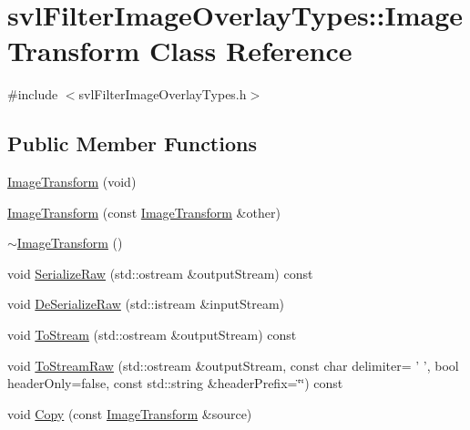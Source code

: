 \hypertarget{classsvl_filter_image_overlay_types_1_1_image_transform}{\section{svl\-Filter\-Image\-Overlay\-Types\-:\-:Image\-Transform Class Reference}
\label{classsvl_filter_image_overlay_types_1_1_image_transform}
}


{\ttfamily \#include $<$svl\-Filter\-Image\-Overlay\-Types.\-h$>$}

\subsection*{Public Member Functions}
\begin{DoxyCompactItemize}
\item 
\hyperlink{classsvl_filter_image_overlay_types_1_1_image_transform_a0aeb462b8748ba0a98dae381a91ee0e1}{Image\-Transform} (void)
\item 
\hyperlink{classsvl_filter_image_overlay_types_1_1_image_transform_a4486f53440c4c5bc2d2681ec78f59fab}{Image\-Transform} (const \hyperlink{classsvl_filter_image_overlay_types_1_1_image_transform}{Image\-Transform} \&other)
\item 
\hyperlink{classsvl_filter_image_overlay_types_1_1_image_transform_a42d898db223c9d5b55711a1bd6194c53}{$\sim$\-Image\-Transform} ()
\item 
void \hyperlink{classsvl_filter_image_overlay_types_1_1_image_transform_a050bcaa8afdef71af3de3847488a2dd7}{Serialize\-Raw} (std\-::ostream \&output\-Stream) const 
\item 
void \hyperlink{classsvl_filter_image_overlay_types_1_1_image_transform_ae42e1520566006fcaff76f2941df8913}{De\-Serialize\-Raw} (std\-::istream \&input\-Stream)
\item 
void \hyperlink{classsvl_filter_image_overlay_types_1_1_image_transform_ade308ea2fb6f2b0f05633e75cc63725a}{To\-Stream} (std\-::ostream \&output\-Stream) const 
\item 
void \hyperlink{classsvl_filter_image_overlay_types_1_1_image_transform_a46ee7ff17901ee27423dc76159ebb3af}{To\-Stream\-Raw} (std\-::ostream \&output\-Stream, const char delimiter= ' ', bool header\-Only=false, const std\-::string \&header\-Prefix=\char`\"{}\char`\"{}) const 
\item 
void \hyperlink{classsvl_filter_image_overlay_types_1_1_image_transform_a5a7573f40bf71b68ef300d74e27a0433}{Copy} (const \hyperlink{classsvl_filter_image_overlay_types_1_1_image_transform}{Image\-Transform} \&source)

\end{DoxyCompactItemize}
